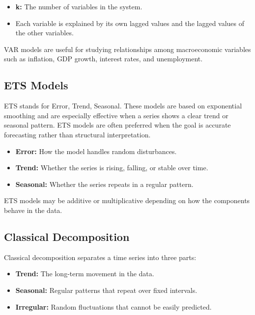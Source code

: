 \documentclass[12pt,a4paper]{article}
\begin{document}
\begin{itemize}
    \item \textbf{k:} The number of variables in the system.
    \item Each variable is explained by its own lagged values and the lagged values of the other variables.
\end{itemize}

VAR models are useful for studying relationships among macroeconomic variables such as inflation, GDP growth, interest rates, and unemployment.

\subsection{ETS Models}

ETS stands for Error, Trend, Seasonal. These models are based on exponential smoothing and are especially effective when a series shows a clear trend or seasonal pattern. ETS models are often preferred when the goal is accurate forecasting rather than structural interpretation.

\begin{itemize}
    \item \textbf{Error:} How the model handles random disturbances.
    \item \textbf{Trend:} Whether the series is rising, falling, or stable over time.
    \item \textbf{Seasonal:} Whether the series repeats in a regular pattern.
\end{itemize}

ETS models may be additive or multiplicative depending on how the components behave in the data.

\subsection{Classical Decomposition}

Classical decomposition separates a time series into three parts:

\begin{itemize}
    \item \textbf{Trend:} The long-term movement in the data.
    \item \textbf{Seasonal:} Regular patterns that repeat over fixed intervals.
    \item \textbf{Irregular:} Random fluctuations that cannot be easily predicted.
\end{itemize}
\end{document}
